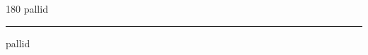 
\begin{frame}
\begin{center}
\begin{turn}{180}
{\fontsize{2.5cm}{1em}\selectfont pallid}
\end{turn}
\vspace{1em}\par  
\hrule
\vspace{1em}\par  
{\fontsize{2.5cm}{1em}\selectfont pallid}
\end{center}
\end{frame}
